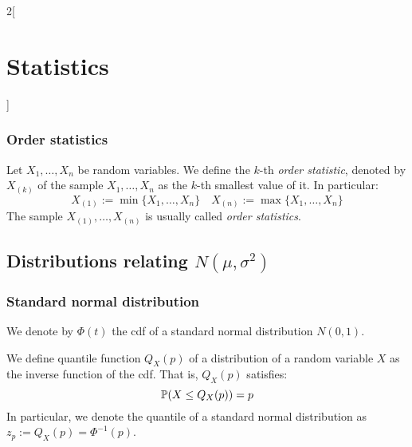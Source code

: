 \documentclass[../../../main_math.tex]{subfiles}
\begin{document}
\begin{multicols}{2}[\section{Statistics}]
  \subsubsection{Order statistics}
  \begin{definition}
    Let $X_1,\ldots,X_n$ be random variables. We define the $k$-th \emph{order statistic}, denoted by $X_{(k)}$ of the sample $X_1,\ldots,X_n$ as the $k$-th smallest value of it. In particular:
    $$X_{(1)}:=\min\{X_1,\ldots,X_n\}\quad X_{(n)}:=\max\{X_1,\ldots,X_n\}$$
    The sample $X_{(1)},\ldots,X_{(n)}$ is usually called \emph{order statistics}.
  \end{definition}
  \subsection{Distributions relating \texorpdfstring{$N(\mu,\sigma^2)$}{N(mu,sigma2)}}
  \subsubsection{Standard normal distribution}
  \begin{definition}
    We denote by $\Phi(t)$ the cdf of a standard normal distribution $N(0,1)$.
  \end{definition}
  \begin{definition}[Quantile]\label{STA_quantile}
    We define quantile function $Q_X(p)$ of a distribution of a random variable $X$ as the inverse function of the cdf. That is, $Q_X(p)$ satisfies:
    $$\mathbb{P}(X\leq Q_X(p))=p$$
    In particular, we denote the quantile of a standard normal distribution as $z_p:=Q_X(p)=\Phi^{-1}(p)$.
  \end{definition}

\end{multicols}
\end{document}
